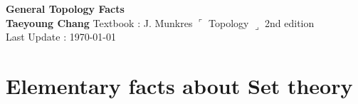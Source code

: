 \documentclass[12pt]{article}
\begin{document}
\begin{titlepage}
	\begin{center}
		\vspace*{5cm}
		\textbf{\Large General Topology Facts}
		\\	
		\vspace{1.5cm}
		\textbf{Taeyoung Chang}
		\vfill
		Textbook : J. Munkres $\ulcorner$ Topology $\lrcorner$ 2nd edition
		\\
		\vspace{0.8cm}
		Last Update : \today
		\vspace*{3cm}
		\thispagestyle{empty}
	\end{center}
\end{titlepage}
\tableofcontents
\clearpage
	
\section{Elementary facts about Set theory}
\smallskip
\end{document}
